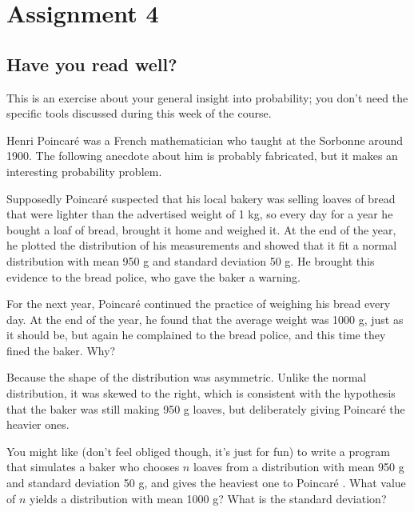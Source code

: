 \documentclass[assignments]{subfiles}
\begin{document}
\section{Assignment 4}


\subsection{Have you read well?}

\begin{exercise}
This is an exercise about your general insight into probability; you don't need the specific tools discussed during this week of the course.

Henri Poincar\'{e} was a French mathematician who taught at the Sorbonne around 1900.
The following anecdote about him is probably fabricated, but it makes an interesting probability problem.

Supposedly Poincar\'{e}  suspected that his local bakery was selling loaves of bread that were lighter than the advertised weight of 1 kg, so every day for a year he bought a loaf of bread, brought it home and weighed it.
At the end of the year, he plotted the distribution of his measurements and showed that it fit a normal distribution with mean 950 g and standard deviation 50 g.
He brought this evidence to the bread police, who gave the baker a warning.

For the next year, Poincar\'{e}  continued the practice of weighing his bread every day.
At the end of the year, he found that the average weight was 1000 g, just as it should be, but again he complained to the bread police, and this time they fined the baker.
Why?

\begin{solution}
Because the shape of the distribution was asymmetric. Unlike the normal distribution, it was skewed to the right, which is consistent with the hypothesis that the baker was still making 950 g loaves, but deliberately giving Poincar\'{e}  the heavier ones.

You might like (don't feel obliged though, it's just for fun) to write a program that simulates a baker who chooses $n$ loaves from a distribution with mean 950 g and standard deviation 50 g, and gives the heaviest one to Poincar\'{e} .
What value of $n$ yields a distribution with mean 1000 g?
What is the standard deviation?


\end{solution}
\end{exercise}
\end{document}
